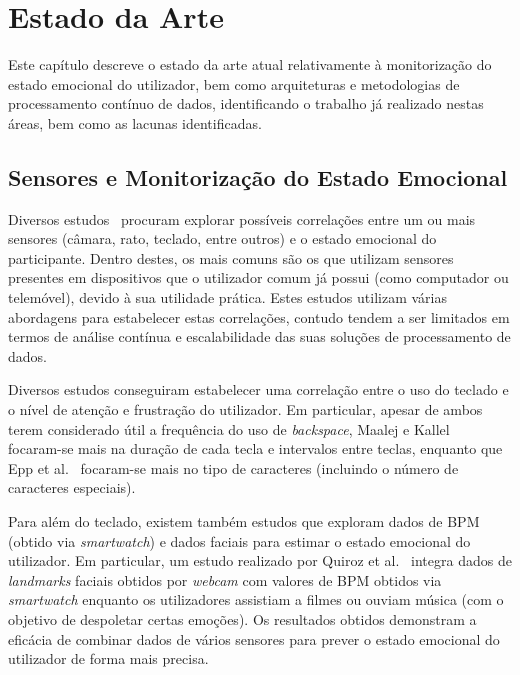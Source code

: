 \chapter{Estado da Arte}
\label{chap:estadodaarte}

\begin{introduction}
Este capítulo descreve o estado da arte atual relativamente à monitorização do estado emocional do utilizador, bem como arquiteturas e metodologias de processamento contínuo de dados, identificando o trabalho já realizado nestas áreas, bem como as lacunas identificadas.
\end{introduction}

\section{Sensores e Monitorização do Estado Emocional}

Diversos estudos~\cite{facial_hrv_study,keyboard_correction_study,keyboard_speed_study} procuram explorar possíveis correlações entre um ou mais sensores (câmara, rato, teclado, entre outros) e o estado emocional do participante. Dentro destes, os mais comuns são os que utilizam sensores presentes em dispositivos que o utilizador comum já possui (como computador ou telemóvel), devido à sua utilidade prática.
Estes estudos utilizam várias abordagens para estabelecer estas correlações, contudo tendem a ser limitados em termos de análise contínua e escalabilidade das suas soluções de processamento de dados.

Diversos estudos conseguiram estabelecer uma correlação entre o uso do teclado e o nível de atenção e frustração do utilizador. Em particular, apesar de ambos terem considerado útil a frequência do uso de \textit{backspace}, Maalej e Kallel~\cite{keyboard_speed_study} focaram-se mais na duração de cada tecla e intervalos entre teclas, enquanto que Epp et al.~\cite{keyboard_correction_study} focaram-se mais no tipo de caracteres (incluindo o número de caracteres especiais).

Para além do teclado, existem também estudos que exploram dados de \ac{BPM} (obtido via \textit{smartwatch}) e dados faciais para estimar o estado emocional do utilizador. Em particular, um estudo realizado por Quiroz et al.~\cite{facial_hrv_study} integra dados de \textit{landmarks} faciais obtidos por \textit{webcam} com valores de \ac{BPM} obtidos via \textit{smartwatch} enquanto os utilizadores assistiam a filmes ou ouviam música (com o objetivo de despoletar certas emoções). Os resultados obtidos demonstram a eficácia de combinar dados de vários sensores para prever o estado emocional do utilizador de forma mais precisa.

